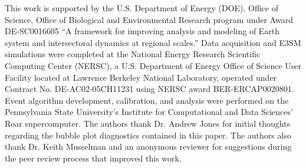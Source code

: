 \documentclass[nhess, manuscript]{copernicus}
\begin{document}
%
%
%
%
%
%
%
%




\begin{acknowledgements}
This work is supported by the U.S. Department of Energy (DOE), Office of Science, Office of Biological and Environmental Research program under Award DE-SC0016605 ``A framework for improving analysis and modeling of Earth system and intersectoral dynamics at regional scales.'' Data acquisition and E3SM simulations were completed at the National Energy Research Scientific Computing Center (NERSC), a U.S. Department of Energy Office of Science User Facility located at Lawrence Berkeley National Laboratory, operated under Contract No. DE-AC02-05CH11231 using NERSC award BER-ERCAP0020801. Event algorithm development, calibration, and analysis were performed on the Pennsylvania State University's Institute for Computational and Data Sciences' Roar supercomputer. The authors thank Dr. Andrew Jones for initial thoughts regarding the bubble plot diagnostics contained in this paper. The authors also thank Dr. Keith Musselman and an anonymous reviewer for suggestions during the peer review process that improved this work.
\end{acknowledgements}

\end{document}
